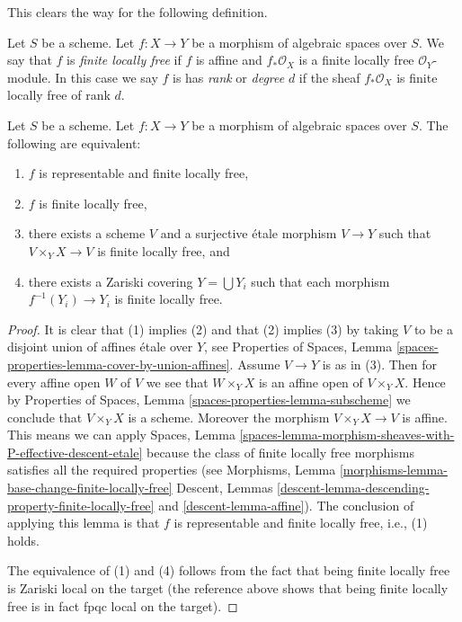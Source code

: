 \noindent
This clears the way for the following definition.

\begin{definition}
\label{definition-finite-locally-free}
Let $S$ be a scheme.
Let $f : X \to Y$ be a morphism of algebraic spaces over $S$.
We say that $f$ is {\it finite locally free} if $f$ is affine
and $f_*\mathcal{O}_X$ is a finite locally free $\mathcal{O}_Y$-module.
In this case we say $f$ is
has {\it rank} or {\it degree} $d$
if the sheaf $f_*\mathcal{O}_X$ is finite locally free of rank $d$.
\end{definition}

\begin{lemma}
\label{lemma-finite-locally-free-local}
Let $S$ be a scheme.
Let $f : X \to Y$ be a morphism of algebraic spaces over $S$.
The following are equivalent:
\begin{enumerate}
\item $f$ is representable and finite locally free,
\item $f$ is finite locally free,
\item there exists a scheme $V$ and a surjective \'etale morphism
$V \to Y$ such that $V \times_Y X \to V$ is finite locally free, and
\item there exists a Zariski covering $Y = \bigcup Y_i$ such that
each morphism $f^{-1}(Y_i) \to Y_i$ is finite locally free.
\end{enumerate}
\end{lemma}

\begin{proof}
It is clear that (1) implies (2) and that (2) implies (3) by taking
$V$ to be a disjoint union of affines \'etale over $Y$, see
Properties of Spaces,
Lemma \ref{spaces-properties-lemma-cover-by-union-affines}.
Assume $V \to Y$ is as in (3). Then for every affine open $W$ of $V$ we see
that $W \times_Y X$ is an affine open of $V \times_Y X$. Hence by
Properties of Spaces, Lemma \ref{spaces-properties-lemma-subscheme}
we conclude that $V \times_Y X$ is a scheme. Moreover the morphism
$V \times_Y X \to V$ is affine. This means we can apply
Spaces,
Lemma \ref{spaces-lemma-morphism-sheaves-with-P-effective-descent-etale}
because the class of finite locally free morphisms
satisfies all the required properties (see
Morphisms, Lemma \ref{morphisms-lemma-base-change-finite-locally-free}
Descent, Lemmas \ref{descent-lemma-descending-property-finite-locally-free}
and \ref{descent-lemma-affine}).
The conclusion of applying this lemma is that $f$ is representable
and finite locally free, i.e., (1) holds.

\medskip\noindent
The equivalence of (1) and (4) follows from the fact that being
finite locally free is Zariski local on the target (the reference above shows
that being finite locally free is in fact fpqc local on the target).
\end{proof}

